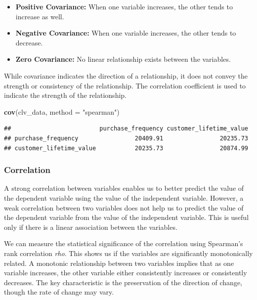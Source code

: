 \documentclass[
]{article}
\newenvironment{Shaded}{\begin{snugshade}}{\end{snugshade}}
\newcommand{\AttributeTok}[1]{\textcolor[rgb]{0.13,0.29,0.53}{#1}}
\newcommand{\FunctionTok}[1]{\textcolor[rgb]{0.13,0.29,0.53}{\textbf{#1}}}
\newcommand{\NormalTok}[1]{#1}
\newcommand{\StringTok}[1]{\textcolor[rgb]{0.31,0.60,0.02}{#1}}
\begin{document}
\begin{itemize}
\item
  \textbf{Positive Covariance:} When one variable increases, the other
  tends to increase as well.
\item
  \textbf{Negative Covariance:} When one variable increases, the other
  tends to decrease.
\item
  \textbf{Zero Covariance:} No linear relationship exists between the
  variables.
\end{itemize}

While covariance indicates the direction of a relationship, it does not
convey the strength or consistency of the relationship. The correlation
coefficient is used to indicate the strength of the relationship.

\begin{Shaded}
\begin{Highlighting}[]
\FunctionTok{cov}\NormalTok{(clv\_data, }\AttributeTok{method =} \StringTok{"spearman"}\NormalTok{)}
\end{Highlighting}
\end{Shaded}

\begin{verbatim}
##                         purchase_frequency customer_lifetime_value
## purchase_frequency                20409.91                20235.73
## customer_lifetime_value           20235.73                20874.99
\end{verbatim}

\subsubsection{\texorpdfstring{\textbf{Correlation}}{Correlation}}\label{correlation}

A strong correlation between variables enables us to better predict the
value of the dependent variable using the value of the independent
variable. However, a weak correlation between two variables does not
help us to predict the value of the dependent variable from the value of
the independent variable. This is useful only if there is a linear
association between the variables.

We can measure the statistical significance of the correlation using
Spearman's rank correlation \emph{rho}. This shows us if the variables
are significantly monotonically related. A monotonic relationship
between two variables implies that as one variable increases, the other
variable either consistently increases or consistently decreases. The
key characteristic is the preservation of the direction of change,
though the rate of change may vary.
\end{document}
